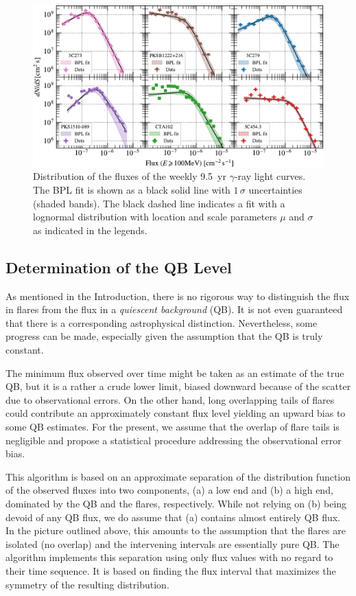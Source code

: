 \documentclass[twocolumn]{aastex62}
\newcommand{\gray}{$\gamma$-ray\xspace}
\begin{document}
\begin{figure}
    \includegraphics[width = .99\linewidth]{fluxdist_weekly_tsmin9.pdf}
    \caption{\label{fig:fluxpdf} Distribution of the fluxes of the weekly 9.5~yr \gray light curves. The BPL fit is shown as a black solid line with $1\,\sigma$ uncertainties (shaded bands). The black dashed line indicates a fit with a lognormal distribution with location and scale parameters $\mu$ and $\sigma$ as indicated in the legends.}
\end{figure}

\subsection{Determination of the QB Level}
\label{sec:qb}
As mentioned in the Introduction, 
there is no rigorous way to distinguish the 
flux in flares from the flux 
in a {\em quiescent background} (QB).
It is not even guaranteed that
there is a corresponding astrophysical distinction.
Nevertheless, some progress can be made,
especially given the assumption that the QB is
truly constant.

The minimum flux observed over time 
might be taken as an estimate of the true QB,
but it is a rather a crude lower limit, biased downward 
because of the scatter due to observational errors.
On the other hand, long overlapping tails of flares 
could contribute an approximately constant flux level
yielding an upward bias to some QB estimates.
For the present, we assume that the overlap of flare tails
is negligible and propose a statistical
procedure addressing the observational error bias.

This algorithm is based on an approximate 
separation of the distribution function of the observed
fluxes into two components,
(a) a low end and (b) a high end, dominated by
the QB and the flares, respectively.
While not relying on (b) being devoid of any QB flux,
we do assume that (a) contains almost entirely QB flux.
In the picture outlined above, this amounts to the
assumption that the flares are isolated (no overlap) 
and the intervening intervals are essentially pure QB.
The algorithm implements this separation
using only flux values with no regard to 
their time sequence.  It is based on finding the
flux interval that maximizes the symmetry of 
the resulting distribution.
\end{document}
